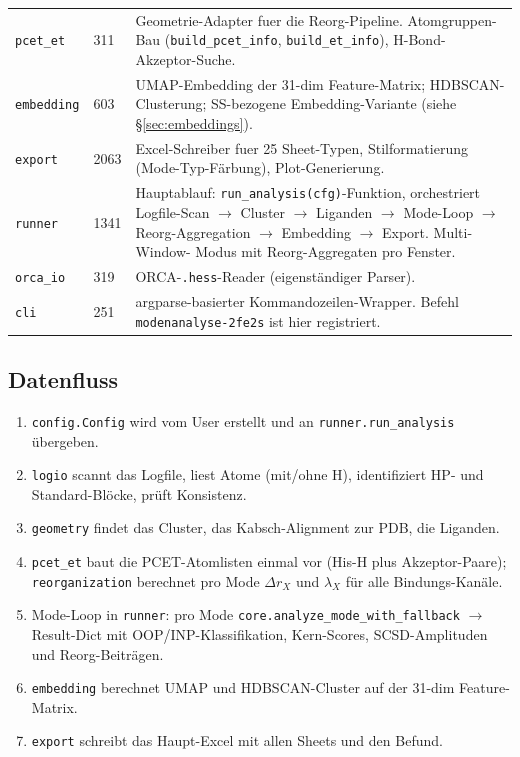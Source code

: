 \documentclass[11pt,a4paper,twoside]{article}
\theoremstyle{remark}
\begin{document}
\begin{longtable}{p{} p{} p{}}
\texttt{pcet\_et} & 311 & Geometrie-Adapter fuer die
  Reorg-Pipeline. Atomgruppen-Bau (\texttt{build\_pcet\_info},
  \texttt{build\_et\_info}), H-Bond-Akzeptor-Suche. \\

\texttt{embedding} & 603 & UMAP-Embedding der 31-dim
  Feature-Matrix; HDBSCAN-Clusterung; SS-bezogene
  Embedding-Variante (siehe \S\ref{sec:embeddings}). \\

\texttt{export} & 2063 & Excel-Schreiber fuer 25 Sheet-Typen,
  Stilformatierung (Mode-Typ-F\"arbung), Plot-Generierung. \\

\texttt{runner} & 1341 & Hauptablauf:
  \texttt{run\_analysis(cfg)}-Funktion, orchestriert Logfile-Scan
  $\to$ Cluster $\to$ Liganden $\to$ Mode-Loop $\to$
  Reorg-Aggregation $\to$ Embedding $\to$ Export. Multi-Window-
  Modus mit Reorg-Aggregaten pro Fenster. \\

\texttt{orca\_io} & 319 & ORCA-\texttt{.hess}-Reader (eigenst\"andiger
  Parser). \\

\texttt{cli} & 251 & argparse-basierter Kommandozeilen-Wrapper.
  Befehl \texttt{modenanalyse-2fe2s} ist hier registriert. \\

\bottomrule
\end{longtable}

\subsection{Datenfluss}

\begin{enumerate}
  \item \texttt{config.Config} wird vom User erstellt und an
        \texttt{runner.run\_analysis} \"ubergeben.
  \item \texttt{logio} scannt das Logfile, liest Atome (mit/ohne H),
        identifiziert HP- und Standard-Bl\"ocke, pr\"uft
        Konsistenz.
  \item \texttt{geometry} findet das Cluster, das Kabsch-Alignment
        zur PDB, die Liganden.
  \item \texttt{pcet\_et} baut die PCET-Atomlisten einmal vor (His-H
        plus Akzeptor-Paare); \texttt{reorganization} berechnet pro
        Mode $\Delta r_X$ und $\lambda_X$ f\"ur alle Bindungs-Kan\"ale.
  \item Mode-Loop in \texttt{runner}: pro Mode
        \texttt{core.analyze\_mode\_with\_fallback} $\to$ Result-Dict
        mit OOP/INP-Klassifikation, Kern-Scores, SCSD-Amplituden und
        Reorg-Beitr\"agen.
  \item \texttt{embedding} berechnet UMAP und HDBSCAN-Cluster auf der
        31-dim Feature-Matrix.
  \item \texttt{export} schreibt das Haupt-Excel mit allen Sheets und
        den Befund.
\end{enumerate}
\end{document}
